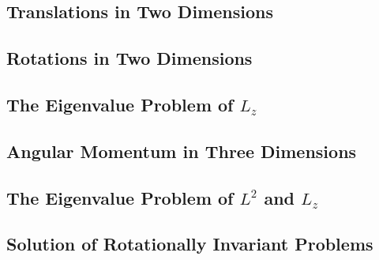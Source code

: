 \subsection{Translations in Two Dimensions}

\subsection{Rotations in Two Dimensions}

\subsection{The Eigenvalue Problem of $L_z$}

\subsection{Angular Momentum in Three Dimensions}

\subsection{The Eigenvalue Problem of $L^2$ and $L_z$}

\subsection{Solution of Rotationally Invariant Problems}
